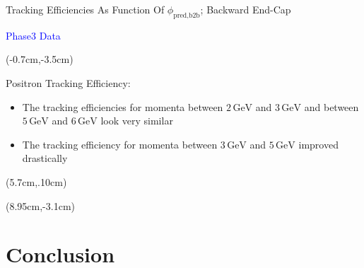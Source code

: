 \documentclass[8pt]{beamer}
\begin{document}
\begin{frame}{Tracking Efficiencies As Function Of $\phi_{\textrm{pred,b2b}}$; Backward End-Cap}
\begin{textblock*}{4cm}
		\textcolor{blue}{Phase3 Data}
	\end{textblock*}
	
	
	
	\begin{textblock*}{6cm}(-0.7cm,-3.5cm)
		
		
			\begin{mybox}
				Positron Tracking Efficiency:
				\begin{itemize}					
					\item The tracking efficiencies for momenta between $2\,\textrm{GeV}$ and $3\,\textrm{GeV}$ and between $5\,\textrm{GeV}$ and $6\,\textrm{GeV}$ look very similar
					
					\item<2,3> The tracking efficiency for momenta between $3\,\textrm{GeV}$ and $5\,\textrm{GeV}$ improved drastically 
				\end{itemize}
			\end{mybox}
		
	\end{textblock*}
	
	
	
			\begin{textblock*}{5cm}(5.7cm,.10cm)
	\end{textblock*}
	
	
	
	\begin{textblock*}{5cm}(8.95cm,-3.1cm)
	\end{textblock*}
	
	
	
	
	
	\pause[3]
	
	
	
	
	
	
\end{frame}



\section{Conclusion}
\end{document}

